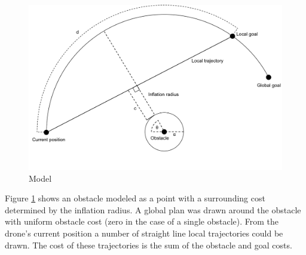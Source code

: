 \documentclass[capstone_report.tex]{subfiles}
\begin{document}
\begin{figure}[H]
    \centering
    \includegraphics[width=1\textwidth]{imgs/obstacle_vs_goal.png}
    \caption{Model}\label{fig:goal_cost_model}
\end{figure}

Figure \ref{fig:goal_cost_model} shows an obstacle modeled as a point with a surrounding cost determined by the inflation radius.  A global plan was drawn around the obstacle with uniform obstacle cost (zero in the case of a single obstacle).  From the drone's current position a number of straight line local trajectories could be drawn.  The cost of these trajectories is the sum of the obstacle and goal costs.
\end{document}
